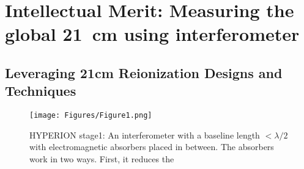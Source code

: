 \documentclass[12pt]{amsart}
\begin{document}
\vspace{-.2in}
\section{Intellectual Merit: Measuring the global 21~cm using interferometer}
\label{sec:int_mer}






\subsection{Leveraging 21cm Reionization Designs and Techniques}



\begin{figure}[!ht]
\centering
\texttt{[image: Figures/Figure1.png]}
 \caption{\small
HYPERION stage1: An interferometer with a baseline length $< \lambda/2$ with electromagnetic absorbers placed in between. The absorbers work in two ways. First, it reduces the 
}
\label{figure1}
\end{figure}
\end{document}
